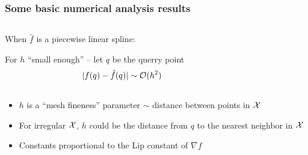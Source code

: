 \documentclass[aspectratio=169]{beamer}
\begin{document}
\begin{frame}
\frametitle{Some basic numerical analysis results}

\begin{columns}
\begin{column}{0.5\textwidth}
When ${\hat f}$ is a piecewise linear spline:

\bigskip

For $h$ ``small enough'' -- let $q$ be the querry point
$$
|f(q) - {\hat f}(q)| \sim {\cal O}( h^2)
$$
\end{column}
\begin{column}{0.5\textwidth}


\end{column}
\end{columns}
\begin{itemize}
\item $h$ is a ``mesh fineness'' parameter $\sim$ distance between points in ${\cal X}$
\item For irregular ${\cal X}$, $h$ could be the distance from $q$ to the nearest neighbor in ${\cal X}$
\item Constants proportional to the Lip constant of $\nabla f$
\end{itemize}
\end{frame}
\end{document}
